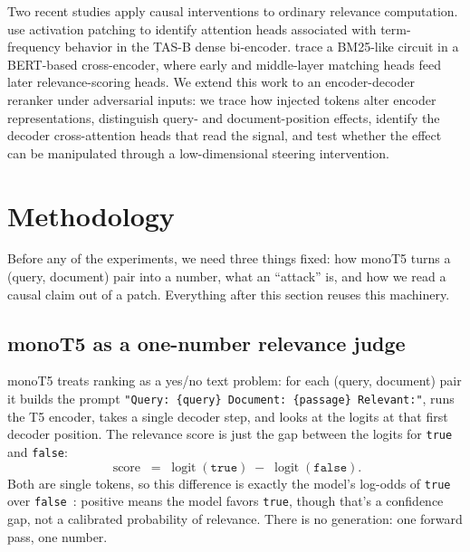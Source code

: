 \documentclass[11pt]{article}
\newcommand{\score}{\operatorname{score}}
\begin{document}
Two recent studies apply causal interventions to ordinary relevance
computation. \citet{chen2024axiomatic} use activation patching to identify
attention heads associated with term-frequency behavior in the TAS-B dense
bi-encoder. \citet{lu2025pathway} trace a BM25-like circuit in a BERT-based
cross-encoder, where early and middle-layer matching heads feed later
relevance-scoring heads. We extend this work to an encoder-decoder reranker
under adversarial inputs: we trace how injected tokens alter encoder
representations, distinguish query- and document-position effects, identify
the decoder cross-attention heads that read the signal, and test whether the
effect can be manipulated through a low-dimensional steering intervention.

\section{Methodology}
\label{sec:method}

Before any of the experiments, we need three things fixed: how monoT5 turns a
(query, document) pair into a number, what an ``attack'' is, and how we read a
causal claim out of a patch. Everything after this section reuses this
machinery.

\subsection{monoT5 as a one-number relevance judge}

monoT5 treats ranking as a yes/no text problem: for each (query, document)
pair it builds the prompt
\texttt{"Query: \{query\} Document: \{passage\} Relevant:"}, runs the T5
encoder, takes a single decoder step, and looks at the logits at that first
decoder position. The relevance score is just the gap between the logits
for \texttt{true} and \texttt{false}:
\begin{equation}
\score \;=\; \operatorname{logit}(\texttt{true}) \;-\; \operatorname{logit}(\texttt{false}).
\label{eq:score}
\end{equation}
Both are single tokens, so this difference is exactly the model's log-odds
of \texttt{true} over \texttt{false}~\citep{nogueira2020document}: positive
means the model favors \texttt{true}, though that's a confidence gap, not
a calibrated probability of relevance. There is no generation: one
forward pass, one number.
\end{document}
